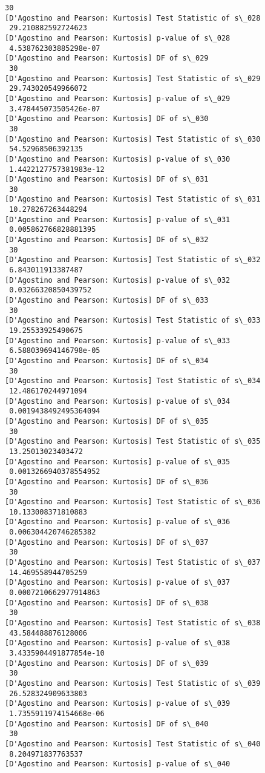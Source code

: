 \documentclass[11pt]{article}
\begin{document}
\begin{Verbatim}[commandchars=\\\{\}]
 30
[D'Agostino and Pearson: Kurtosis] Test Statistic of s\_028
 29.210882592724623
[D'Agostino and Pearson: Kurtosis] p-value of s\_028
 4.538762303885298e-07
[D'Agostino and Pearson: Kurtosis] DF of s\_029
 30
[D'Agostino and Pearson: Kurtosis] Test Statistic of s\_029
 29.743020549966072
[D'Agostino and Pearson: Kurtosis] p-value of s\_029
 3.478445073505426e-07
[D'Agostino and Pearson: Kurtosis] DF of s\_030
 30
[D'Agostino and Pearson: Kurtosis] Test Statistic of s\_030
 54.52968506392135
[D'Agostino and Pearson: Kurtosis] p-value of s\_030
 1.4422127757381983e-12
[D'Agostino and Pearson: Kurtosis] DF of s\_031
 30
[D'Agostino and Pearson: Kurtosis] Test Statistic of s\_031
 10.278267263448294
[D'Agostino and Pearson: Kurtosis] p-value of s\_031
 0.005862766828881395
[D'Agostino and Pearson: Kurtosis] DF of s\_032
 30
[D'Agostino and Pearson: Kurtosis] Test Statistic of s\_032
 6.843011913387487
[D'Agostino and Pearson: Kurtosis] p-value of s\_032
 0.03266320850439752
[D'Agostino and Pearson: Kurtosis] DF of s\_033
 30
[D'Agostino and Pearson: Kurtosis] Test Statistic of s\_033
 19.25533925490675
[D'Agostino and Pearson: Kurtosis] p-value of s\_033
 6.588039694146798e-05
[D'Agostino and Pearson: Kurtosis] DF of s\_034
 30
[D'Agostino and Pearson: Kurtosis] Test Statistic of s\_034
 12.486170244971094
[D'Agostino and Pearson: Kurtosis] p-value of s\_034
 0.0019438492495364094
[D'Agostino and Pearson: Kurtosis] DF of s\_035
 30
[D'Agostino and Pearson: Kurtosis] Test Statistic of s\_035
 13.25013023403472
[D'Agostino and Pearson: Kurtosis] p-value of s\_035
 0.0013266940378554952
[D'Agostino and Pearson: Kurtosis] DF of s\_036
 30
[D'Agostino and Pearson: Kurtosis] Test Statistic of s\_036
 10.133008371810883
[D'Agostino and Pearson: Kurtosis] p-value of s\_036
 0.006304420746285382
[D'Agostino and Pearson: Kurtosis] DF of s\_037
 30
[D'Agostino and Pearson: Kurtosis] Test Statistic of s\_037
 14.469558944705259
[D'Agostino and Pearson: Kurtosis] p-value of s\_037
 0.0007210662977914863
[D'Agostino and Pearson: Kurtosis] DF of s\_038
 30
[D'Agostino and Pearson: Kurtosis] Test Statistic of s\_038
 43.584488876128006
[D'Agostino and Pearson: Kurtosis] p-value of s\_038
 3.4335904491877854e-10
[D'Agostino and Pearson: Kurtosis] DF of s\_039
 30
[D'Agostino and Pearson: Kurtosis] Test Statistic of s\_039
 26.528324909633803
[D'Agostino and Pearson: Kurtosis] p-value of s\_039
 1.7355911974154668e-06
[D'Agostino and Pearson: Kurtosis] DF of s\_040
 30
[D'Agostino and Pearson: Kurtosis] Test Statistic of s\_040
 8.204971837763537
[D'Agostino and Pearson: Kurtosis] p-value of s\_040

\end{Verbatim}
\end{document}
